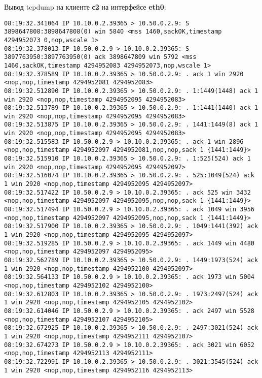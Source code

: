 \documentclass[a4paper,12pt]{article}
\begin{document}
Вывод tcpdump на клиенте \textbf{с2} на интерфейсе \textbf{eth0}:
\begin{Verbatim}
08:19:32.341064 IP 10.10.0.2.39365 > 10.50.0.2.9: S 3898647808:3898647808(0) win 5840 <mss 1460,sackOK,timestamp 4294952073 0,nop,wscale 1>
08:19:32.378013 IP 10.50.0.2.9 > 10.10.0.2.39365: S 3897763950:3897763950(0) ack 3898647809 win 5792 <mss 1460,sackOK,timestamp 4294952083 4294952073,nop,wscale 1>
08:19:32.378589 IP 10.10.0.2.39365 > 10.50.0.2.9: . ack 1 win 2920 <nop,nop,timestamp 4294952081 4294952083>
08:19:32.512890 IP 10.10.0.2.39365 > 10.50.0.2.9: . 1:1449(1448) ack 1 win 2920 <nop,nop,timestamp 4294952095 4294952083>
08:19:32.513789 IP 10.10.0.2.39365 > 10.50.0.2.9: . 1:1441(1440) ack 1 win 2920 <nop,nop,timestamp 4294952095 4294952083>
08:19:32.513875 IP 10.10.0.2.39365 > 10.50.0.2.9: . 1441:1449(8) ack 1 win 2920 <nop,nop,timestamp 4294952095 4294952083>
08:19:32.515583 IP 10.50.0.2.9 > 10.10.0.2.39365: . ack 1 win 2896 <nop,nop,timestamp 4294952097 4294952081,nop,nop,sack 1 {1441:1449}>
08:19:32.515910 IP 10.10.0.2.39365 > 10.50.0.2.9: . 1:525(524) ack 1 win 2920 <nop,nop,timestamp 4294952095 4294952097>
08:19:32.516074 IP 10.10.0.2.39365 > 10.50.0.2.9: . 525:1049(524) ack 1 win 2920 <nop,nop,timestamp 4294952095 4294952097>
08:19:32.517422 IP 10.50.0.2.9 > 10.10.0.2.39365: . ack 525 win 3432 <nop,nop,timestamp 4294952097 4294952095,nop,nop,sack 1 {1441:1449}>
08:19:32.517494 IP 10.50.0.2.9 > 10.10.0.2.39365: . ack 1049 win 3956 <nop,nop,timestamp 4294952097 4294952095,nop,nop,sack 1 {1441:1449}>
08:19:32.517900 IP 10.10.0.2.39365 > 10.50.0.2.9: . 1049:1441(392) ack 1 win 2920 <nop,nop,timestamp 4294952095 4294952097>
08:19:32.519285 IP 10.50.0.2.9 > 10.10.0.2.39365: . ack 1449 win 4480 <nop,nop,timestamp 4294952097 4294952095>
08:19:32.562789 IP 10.10.0.2.39365 > 10.50.0.2.9: . 1449:1973(524) ack 1 win 2920 <nop,nop,timestamp 4294952100 4294952097>
08:19:32.564133 IP 10.50.0.2.9 > 10.10.0.2.39365: . ack 1973 win 5004 <nop,nop,timestamp 4294952102 4294952100>
08:19:32.612803 IP 10.10.0.2.39365 > 10.50.0.2.9: . 1973:2497(524) ack 1 win 2920 <nop,nop,timestamp 4294952105 4294952102>
08:19:32.614046 IP 10.50.0.2.9 > 10.10.0.2.39365: . ack 2497 win 5528 <nop,nop,timestamp 4294952107 4294952105>
08:19:32.672925 IP 10.10.0.2.39365 > 10.50.0.2.9: . 2497:3021(524) ack 1 win 2920 <nop,nop,timestamp 4294952111 4294952107>
08:19:32.674273 IP 10.50.0.2.9 > 10.10.0.2.39365: . ack 3021 win 6052 <nop,nop,timestamp 4294952113 4294952111>
08:19:32.722991 IP 10.10.0.2.39365 > 10.50.0.2.9: . 3021:3545(524) ack 1 win 2920 <nop,nop,timestamp 4294952116 4294952113>

\end{Verbatim}
\end{document}
